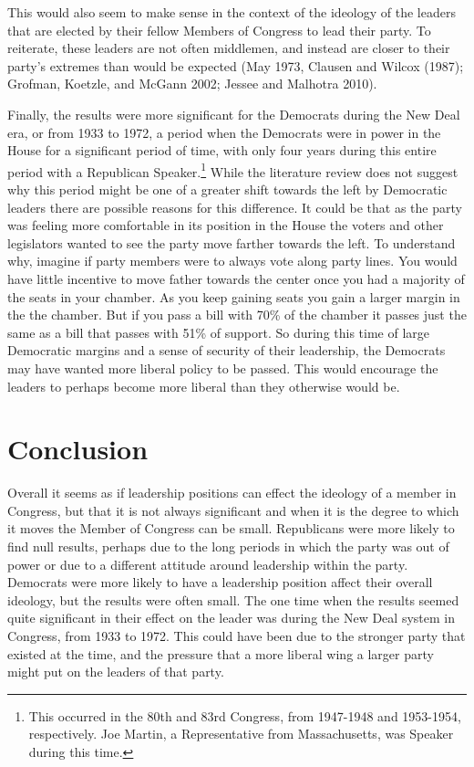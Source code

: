 \documentclass[12pt,twoside]{reedthesis}
\begin{document}
  This would also seem to make sense in the context of the ideology of the
  leaders that are elected by their fellow Members of Congress to lead
  their party. To reiterate, these leaders are not often middlemen, and
  instead are closer to their party's extremes than would be expected (May
  1973, Clausen and Wilcox (1987); Grofman, Koetzle, and McGann 2002;
  Jessee and Malhotra 2010).
  
  Finally, the results were more significant for the Democrats during the
  New Deal era, or from 1933 to 1972, a period when the Democrats were in
  power in the House for a significant period of time, with only four
  years during this entire period with a Republican
  Speaker.\footnote{This occurred in the 80th and 83rd Congress, from 1947-1948 and 1953-1954, respectively. Joe Martin, a Representative from Massachusetts, was Speaker during this time.}
  While the literature review does not suggest why this period might be
  one of a greater shift towards the left by Democratic leaders there are
  possible reasons for this difference. It could be that as the party was
  feeling more comfortable in its position in the House the voters and
  other legislators wanted to see the party move farther towards the left.
  To understand why, imagine if party members were to always vote along
  party lines. You would have little incentive to move father towards the
  center once you had a majority of the seats in your chamber. As you keep
  gaining seats you gain a larger margin in the the chamber. But if you
  pass a bill with 70\% of the chamber it passes just the same as a bill
  that passes with 51\% of support. So during this time of large
  Democratic margins and a sense of security of their leadership, the
  Democrats may have wanted more liberal policy to be passed. This would
  encourage the leaders to perhaps become more liberal than they otherwise
  would be.
  
  \section{Conclusion}\label{conclusion-1}
  
  Overall it seems as if leadership positions can effect the ideology of a
  member in Congress, but that it is not always significant and when it is
  the degree to which it moves the Member of Congress can be small.
  Republicans were more likely to find null results, perhaps due to the
  long periods in which the party was out of power or due to a different
  attitude around leadership within the party. Democrats were more likely
  to have a leadership position affect their overall ideology, but the
  results were often small. The one time when the results seemed quite
  significant in their effect on the leader was during the New Deal system
  in Congress, from 1933 to 1972. This could have been due to the stronger
  party that existed at the time, and the pressure that a more liberal
  wing a larger party might put on the leaders of that party.
  
\end{document}
